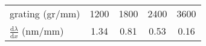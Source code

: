 \begin{tabular}{l|cccc}
\toprule
grating (gr/mm)    & 1200 & 1800 & 2400 & 3600 \\
$\frac{\text{d}\lambda}{\text{d}x}$ (nm/mm) & 1.34 & 0.81 & 0.53 & 0.16 \\
\bottomrule
\end{tabular}